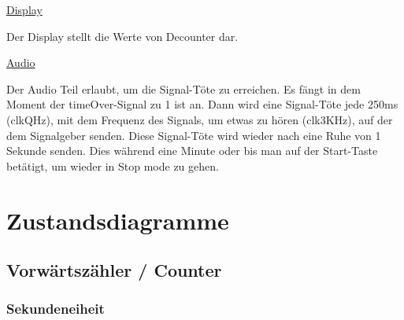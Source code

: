 \documentclass[a4paper, 11pt]{article}
\begin{document}
\begin{flushleft}
	     \underline{\large Display}
     
	     \vspace{0.1cm}
     
	     {\small Der Display stellt die Werte von Decounter dar. }
     
	     \vspace{1cm}
     
	     \underline{\large Audio}
     
	     \vspace{0.1cm}
     
		 {\small Der Audio Teil erlaubt, um die Signal-Töte zu erreichen.
		 \newline
		 Es fängt in dem Moment der timeOver-Signal zu 1 ist an. Dann wird eine Signal-Töte jede 250ms (clkQHz), mit dem Frequenz des Signals, um etwas zu hören (clk3KHz), auf der dem Signalgeber senden. Diese Signal-Töte wird wieder nach eine Ruhe von 1 Sekunde senden. Dies während eine Minute oder bis man auf der Start-Taste betätigt, um wieder in Stop mode zu gehen. 
		 }
     
    \end{flushleft} %
  

	\newpage


	\section{Zustandsdiagramme}
	
		\subsection{Vorwärtszähler / Counter}
			\subsubsection{Sekundeneiheit}
	
\end{document}
